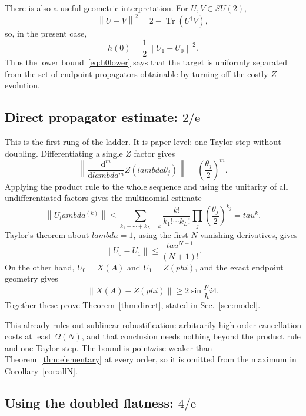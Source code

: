 \documentclass[%
  aps,
  pra,
  preprint,
  superscriptaddress,
  amsmath,amssymb,
  nofootinbib,
  floatfix,
]{revtex4-2}
\def\lambda{lambda}\def\tau{tau}\def\phi{phi}\def\alpha{alpha}%
\theoremstyle{definition}
\theoremstyle{remark}
\newcommand{\Tr}{\operatorname{Tr}}
\newcommand{\norm}[1]{\left\lVert #1\right\rVert}
\newcommand{\tauvar}{\tau}
\begin{document}
There is also a useful geometric interpretation. For $U,V\in SU(2)$,
\begin{equation}
\norm{U-V}^2=2-\Tr(U^\dagger V),
\end{equation}
so, in the present case,
\begin{equation}
h(0)=\frac12\norm{U_1-U_0}^2.
\label{eq:h-distance}
\end{equation}
Thus the lower bound~\eqref{eq:h0lower} says that the target is uniformly separated from the
set of endpoint propagators obtainable by turning off the costly $Z$ evolution.

\subsection{Direct propagator estimate: \texorpdfstring{$2/\mathrm{e}$}{2/e}}
\label{sec:direct}

This is the first rung of the ladder. It is paper-level: one Taylor step
without doubling. Differentiating a single $Z$ factor gives
\[
\norm{\frac{\mathrm{d}^m}{\mathrm{d}\lambda^m}Z(\lambda\theta_j)}
=\left(\frac{\theta_j}{2}\right)^m.
\]
Applying the product rule to the whole sequence and using the unitarity of all undifferentiated
factors gives the multinomial estimate
\begin{equation}
\norm{U_\lambda^{(k)}}
\le
\sum_{k_1+\cdots+k_L=k}
\frac{k!}{k_1!\cdots k_L!}
\prod_j\left(\frac{\theta_j}{2}\right)^{k_j}
=\tauvar^k.
\label{eq:Ukbound}
\end{equation}
Taylor's theorem about $\lambda=1$, using the first $N$ vanishing derivatives, gives
\begin{equation}
\norm{U_0-U_1}
\le\frac{\tauvar^{N+1}}{(N+1)!}.
\label{eq:taylorU}
\end{equation}
On the other hand, $U_0=X(A)$ and $U_1=Z(\phi)$, and the exact endpoint geometry gives
\begin{equation}
\norm{X(A)-Z(\phi)}
\ge2\sin\frac\phi4.
\end{equation}
Together these prove Theorem~\ref{thm:direct}, stated in Sec.~\ref{sec:model}.

This already rules out sublinear robustification: arbitrarily high-order cancellation costs at
least $\Omega(N)$, and that conclusion needs nothing beyond the product rule and one Taylor
step. The bound is pointwise weaker than Theorem~\ref{thm:elementary} at every order, so it is
omitted from the maximum in Corollary~\ref{cor:allN}.

\subsection{Using the doubled flatness: \texorpdfstring{$4/\mathrm{e}$}{4/e}}
\label{sec:doubled}
\end{document}
